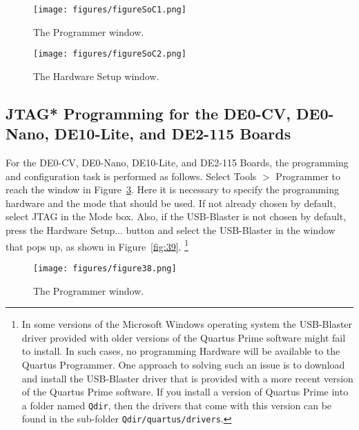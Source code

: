 \begin{figure}[H]
   \begin{center}
      \texttt{[image: figures/figureSoC1.png]}
   \caption{The Programmer window.} 
	 \label{fig:SoC1}
	 \end{center}
\end{figure}

\begin{figure}[H]
   \begin{center}
      \texttt{[image: figures/figureSoC2.png]}
   \caption{The Hardware Setup window.} 
	 \label{fig:SoC2}
	 \end{center}
\end{figure}

\subsection{JTAG* Programming for the DE0-CV, DE0-Nano, DE10-Lite, and DE2-115 Boards}

For the DE0-CV, DE0-Nano, DE10-Lite, and DE2-115 Boards, the
programming and configuration task is performed as follows. 
Select {\sf Tools $>$ Programmer} to reach the window in Figure~\ref{fig:38}.
Here it is necessary to specify the programming hardware and 
the mode that should be used. If not already chosen by default, 
select JTAG in the Mode box.
Also, if the USB-Blaster is not chosen by default, press the 
{\sf Hardware Setup...} button and select the USB-Blaster in the window
that pops up, as shown in Figure~\ref{fig:39}. \footnote{In some versions of the
Microsoft Windows operating system the USB-Blaster driver provided with older versions of the 
Quartus Prime software might fail to install. In such cases, no programming Hardware will be 
available to the Quartus Programmer. One approach to solving such an issue is to download and 
install the USB-Blaster driver that is provided with a more recent version of the Quartus 
Prime software. If you install a version of Quartus Prime into a folder named
\texttt{Qdir}, then the drivers that come with this version can be found in the sub-folder
\texttt{Qdir/quartus/drivers}.}  

\begin{figure}[H]
   \begin{center}
      \texttt{[image: figures/figure38.png]}
   \caption{The Programmer window.} 
	 \label{fig:38}
	 \end{center}
\end{figure}

